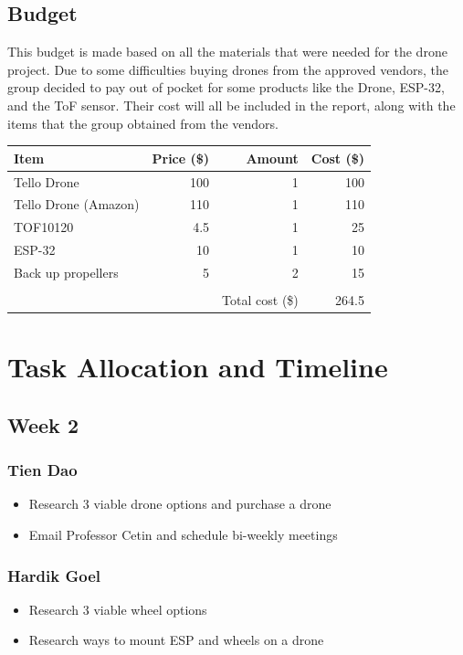 \documentclass[12pt]{article}
\begin{document}
        \subsection{Budget}
            This budget is made based on all the materials that were needed for the drone project.
            Due to some difficulties buying drones from the approved vendors, the group decided to pay out of pocket for some products like the Drone, ESP-32, and the ToF sensor.
            Their cost will all be included in the report, along with the items that the group obtained from the vendors.
            \begin{tabular}{|l|r|r|r|}
                \hline
                Item & Price (\$) & Amount & Cost (\$) \\\hline
                Tello Drone & 100 & 1 & 100 \\\hline
                Tello Drone (Amazon) & 110 & 1 & 110 \\\hline
                TOF10120 & 4.5 & 1 & 25 \\\hline
                ESP-32 & 10 & 1 & 10 \\\hline
                Back up propellers & 5 & 2 & 15 \\\hline
                & & & \\\hline
                & & Total cost (\$) & 264.5 \\\hline
            \end{tabular}
    
    \newpage
    \section{Task Allocation and Timeline}
        \subsection*{Week 2}
            \subsubsection*{Tien Dao}
                \begin{itemize}
                    \item Research 3 viable drone options and purchase a drone
                    \item Email Professor Cetin and schedule bi-weekly meetings
                \end{itemize}
            \subsubsection*{Hardik Goel}
                \begin{itemize}
                    \item Research 3 viable wheel options
                    \item Research ways to mount ESP and wheels on a drone
                \end{itemize}
\end{document}
